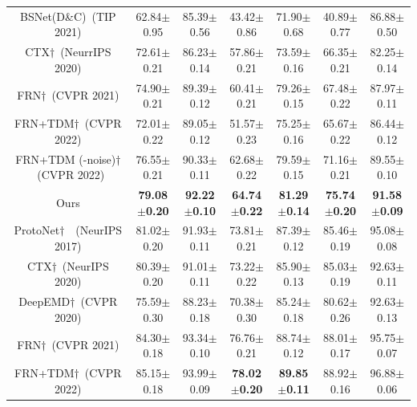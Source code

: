 \documentclass[letterpaper]{article} %
\begin{document}
\begin{table}[!ht]
\begin{tabular}{ccccccc}
BSNet(D\&C)~(TIP 2021)%
& 62.84$\pm$0.95
& 85.39$\pm$0.56
& 43.42$\pm$0.86
& 71.90$\pm$0.68
& 40.89$\pm$0.77
& 86.88$\pm$0.50 \\

CTX$\dag$~(NeurrIPS 2020)%
& 72.61$\pm$0.21
& 86.23$\pm$0.14
& 57.86$\pm$0.21
& 73.59$\pm$0.16
& 66.35$\pm$0.21
& 82.25$\pm$0.14 \\


FRN$\dag$~(CVPR 2021)%
& 74.90$\pm$0.21
& 89.39$\pm$0.12
& 60.41$\pm$0.21
& 79.26$\pm$0.15
& 67.48$\pm$0.22
& 87.97$\pm$0.11 \\

FRN+TDM$\dag$~(CVPR 2022)%
& 72.01$\pm$0.22
& 89.05$\pm$0.12
& 51.57$\pm$0.23
& 75.25$\pm$0.16
& 65.67$\pm$0.22
& 86.44$\pm$0.12  \\


FRN+TDM (-noise)$\dag$~(CVPR 2022)%
& 76.55$\pm$0.21
& 90.33$\pm$0.11
& 62.68$\pm$0.22
& 79.59$\pm$0.15
& 71.16$\pm$0.21
& 89.55$\pm$0.10  \\



Ours
& \textbf{79.08$\pm$0.20}
& \textbf{92.22$\pm$0.10}
& \textbf{64.74$\pm$0.22}
& \textbf{81.29$\pm$0.14}
& \textbf{75.74$\pm$0.20}
& \textbf{91.58$\pm$0.09} \\ \midrule



ProtoNet$\dag$~~(NeurIPS 2017)%
& 81.02$\pm$0.20
& 91.93$\pm$0.11
& 73.81$\pm$0.21
& 87.39$\pm$0.12
& 85.46$\pm$0.19
& 95.08$\pm$0.08 \\


CTX$\dag$~(NeurIPS 2020)%
& 80.39$\pm$0.20
& 91.01$\pm$0.11
& 73.22$\pm$0.22
& 85.90$\pm$0.13
& 85.03$\pm$0.19
& 92.63$\pm$0.11 \\



DeepEMD$\dag$~(CVPR 2020)%
& 75.59$\pm$0.30
& 88.23$\pm$0.18
& 70.38$\pm$0.30
& 85.24$\pm$0.18
& 80.62$\pm$0.26
& 92.63$\pm$0.13  \\



FRN$\dag$~(CVPR 2021)%
& 84.30$\pm$0.18
& 93.34$\pm$0.10
& {76.76$\pm$0.21}
& {88.74$\pm$0.12}
& 88.01$\pm$0.17
& 95.75$\pm$0.07 \\

FRN+TDM$\dag$~(CVPR 2022)%
& 85.15$\pm$0.18
& 93.99$\pm$0.09
& \textbf{78.02$\pm$0.20}
& \textbf{89.85$\pm$0.11}
& 88.92$\pm$0.16
& 96.88$\pm$0.06  \\




\end{tabular}
\end{table}
\end{document}
